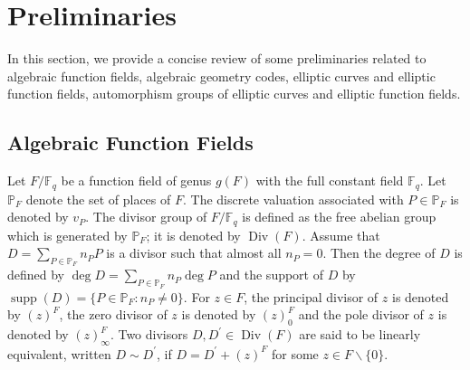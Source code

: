 \documentclass[journal,12pt,onecolumn]{IEEEtran}
\begin{document}
\section{Preliminaries}\label{pre}
In this section, we provide a concise review of some preliminaries related to algebraic function fields, algebraic geometry codes, elliptic curves and elliptic function fields, automorphism groups of elliptic curves and elliptic function fields.


\subsection{Algebraic Function Fields}
Let $F/\mathbb{F}_q$ be a function field of genus $g(F)$ with the full constant field $\mathbb{F}_q$. Let $\mathbb{P}_F$ denote the set of places of $F$. The discrete valuation associated with $P\in\mathbb{P}_F$ is denoted by $v_P$. The divisor group of $F/\mathbb{F}_q$ is defined as the free abelian group which is generated by $\mathbb{P}_F$; it is denoted by $\operatorname{Div}(F)$. Assume that $D=\sum_{P\in\mathbb{P}_F}n_PP$ is a divisor such that almost all $n_P=0$. Then the degree of $D$ is defined by $\deg D=\sum_{P\in\mathbb{P}_F}n_P\deg P$ and the support of $D$ by $\operatorname{supp}(D)=\{P\in \mathbb{P}_F:n_P\neq0\}$. For $z\in F$, the principal divisor of $z$ is denoted by $(z)^F$, the zero divisor of $z$ is denoted by $(z)^F_0$ and the pole divisor of $z$ is denoted by $(z)^F_\infty$. Two divisors $D,D^\prime\in\operatorname{Div}(F)$ are said to be linearly equivalent, written $D\sim D^\prime$, if $D=D^\prime+(z)^F$ for some $z\in F\backslash\{0\}$. 
\end{document}
